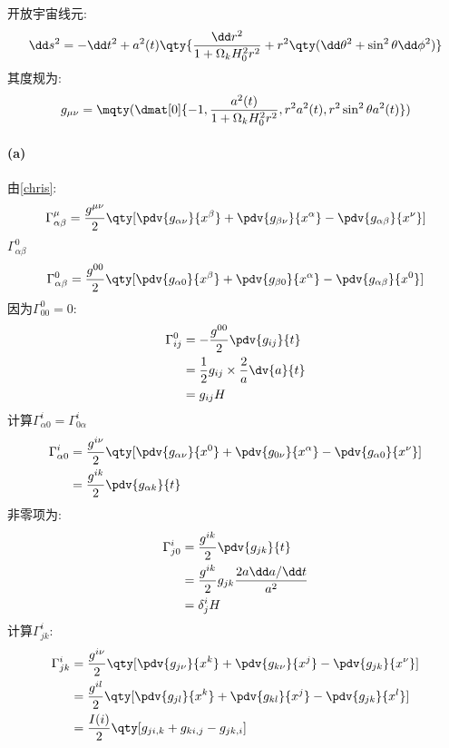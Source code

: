 开放宇宙线元:
\begin{equation*}
    \dd s^2 = -\dd t^2 + a^2(t)\qty{\frac{\dd r^2}{1+\Omega_kH_0^2r^2} + r^2\qty(\dd \theta^2 + \sin^2 \theta \dd \phi^2)}
\end{equation*}
其度规为:
\begin{align*}
    g_{\mu\nu} = \mqty(\dmat[0]{-1, \frac{a^2(t)}{1 + \Omega_kH_0^2r^2}, r^2a^2(t), r^2\sin^2\theta a^2(t)})
\end{align*}
\paragraph{(a)}
由\ref{chris}:
\begin{align*}
    \Gamma^\mu_{\alpha\beta} &= \frac{g^{\mu\nu}}{2}\qty[\pdv{g_{\alpha\nu}}{x^\beta} + \pdv{g_{\beta\nu}}{x^\alpha} - \pdv{g_{\alpha\beta}}{x^\nu}]\\
\end{align*}
$\Gamma^0_{\alpha\beta}$
\begin{align*}
    \Gamma^0_{\alpha\beta} &= \frac{g^{00}}{2}\qty[\pdv{g_{\alpha 0}}{x^\beta} + \pdv{g_{\beta 0}}{x^\alpha} - \pdv{g_{\alpha\beta}}{x^0}]\\        
\end{align*}
因为$\Gamma^0_{00} = 0$:
\begin{align*}
    \Gamma^0_{ij} &= -\frac{g^{00}}{2}\pdv{g_{ij}}{t} \\
    &=\frac{1}{2}g_{ij}\times \frac{2}{a}\dv{a}{t} \\
    &=g_{ij}H
\end{align*}
计算$\Gamma^i_{\alpha 0} =\Gamma^i_{0\alpha} $
\begin{align*}
    \Gamma^i_{\alpha 0} &= \frac{g^{i\nu}}{2}\qty[\pdv{g_{\alpha \nu}}{x^0} + \pdv{g_{0 \nu}}{x^\alpha} - \pdv{g_{\alpha 0}}{x^\nu}]\\        
        &= \frac{g^{ik}}{2}\pdv{g_{\alpha k}}{t}
\end{align*}
非零项为:
\begin{align*}
    \Gamma^i_{j0} &=\frac{g^{ik}}{2}\pdv{g_{jk}}{t}\\
    & = \frac{g^{ik}}{2}g_{jk}\frac{2a\dd a/\dd t}{a^2}\\
    & = \delta^i_jH
\end{align*}
计算$\Gamma^i_{jk}$:
\begin{align*}
    \Gamma^i_{jk} &= \frac{g^{i\nu}}{2}\qty[\pdv{g_{j\nu}}{x^k} + \pdv{g_{k\nu}}{x^j} - \pdv{g_{jk}}{x^\nu}]\\
        &=\frac{g^{il}}{2}\qty[\pdv{g_{jl}}{x^k} + \pdv{g_{kl}}{x^j} - \pdv{g_{jk}}{x^l}]\\
        &=\frac{I(i)}{2}\qty[g_{ji,k} + g_{ki, j} - g_{jk, i}]
\end{align*}
